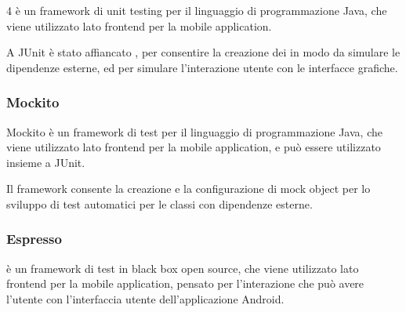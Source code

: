 \documentclass[../manuale-sviluppatore.tex]{subfiles}
\begin{document}
 4 è un framework di unit testing per il linguaggio di programmazione Java, che viene utilizzato lato frontend per la mobile application.

A JUnit è stato affiancato , per consentire la creazione dei  in modo da simulare le dipendenze esterne, ed  per simulare l’interazione utente con le interfacce grafiche.

\subsubsection{Mockito}%
\label{subs:mockito}

Mockito è un framework di test per il linguaggio di programmazione Java, che viene utilizzato lato frontend per la mobile application, e può essere utilizzato insieme a JUnit.

Il framework consente la creazione e la configurazione di mock object per lo sviluppo di test automatici per le classi con dipendenze esterne.

\subsubsection{Espresso}%
\label{subs:espresso}

 è un framework di test in black box open source, che viene utilizzato lato frontend per la mobile application, pensato per l'interazione che può avere l'utente con l'interfaccia utente dell'applicazione Android.
\end{document}
